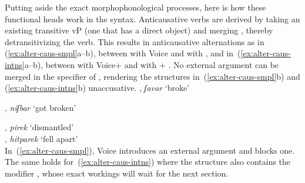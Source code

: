 Putting aside the exact morphophonological processes, here is how these functional heads work in the syntax. Anticausative verbs are derived by taking an existing transitive vP (one that has a direct object) and merging \vz, thereby detransitivizing the verb. This results in anticausative alternations as in (\ref{ex:alter-caus-smpl}a--b), between  with Voice and with {\vz}, and in~(\ref{ex:alter-caus-intns}a--b), between  with Voice+{\va} and with {\vz}+{\va} . No external argument can be merged in the specifier of {\vz}, rendering the structures in~(\ref{ex:alter-caus-smpl}b) and (\ref{ex:alter-caus-intns}b) unaccusative.
\pex\label{ex:alter-caus-smpl}
	\a {\tkal}, \emph{ʃavar} `broke'\\

	\a {\tnif}, \emph{niʃbar} `got broken'\\
\xe

\pex \label{ex:alter-caus-intns}
	\a {\tpie}, \emph{pirek} `dismantled'\\
	\a {\thit}, \emph{hitparek} `fell apart'\\
\xe
In~(\ref{ex:alter-caus-smpl}), Voice introduces an external argument and {\vz} blocks one. The same holds for~(\ref{ex:alter-caus-intns}) where the structure also contains the modifier {\va}, whose exact workings will wait for the next section.

